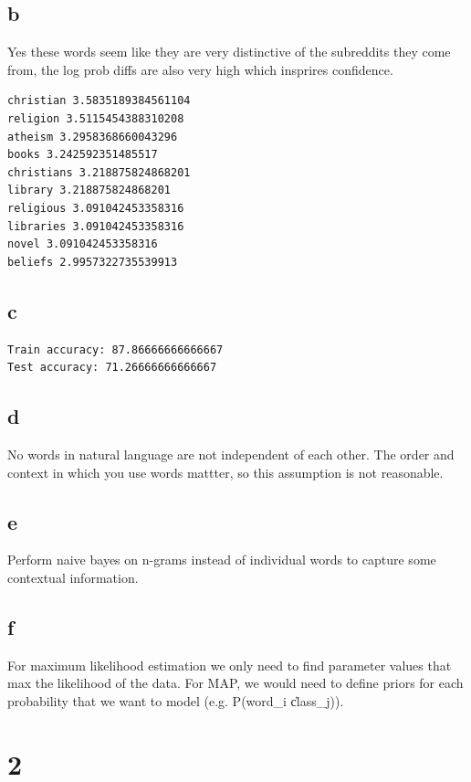 \documentclass[11pt]{article}
\begin{document}
\subsection{b}

Yes these words seem like they are very distinctive of the subreddits they come from, the log prob diffs are also very high which insprires confidence.

\begin{verbatim}
christian 3.5835189384561104
religion 3.5115454388310208
atheism 3.2958368660043296
books 3.242592351485517
christians 3.218875824868201
library 3.218875824868201
religious 3.091042453358316
libraries 3.091042453358316
novel 3.091042453358316
beliefs 2.9957322735539913
\end{verbatim}

\subsection{c}

\begin{verbatim}
Train accuracy: 87.86666666666667
Test accuracy: 71.26666666666667
\end{verbatim}  

\subsection{d}

No words in natural language are not independent of each other. The order and context in which you use words mattter, so this assumption is not reasonable.

\subsection{e}

Perform naive bayes on n-grams instead of individual words to capture some contextual information.

\subsection{f}

For maximum likelihood estimation we only need to find parameter values that max the likelihood of the data. For MAP, we would need to define priors for each probability that we want to model (e.g. P(word\_i \| class\_j)).


\section{2}
\end{document}
